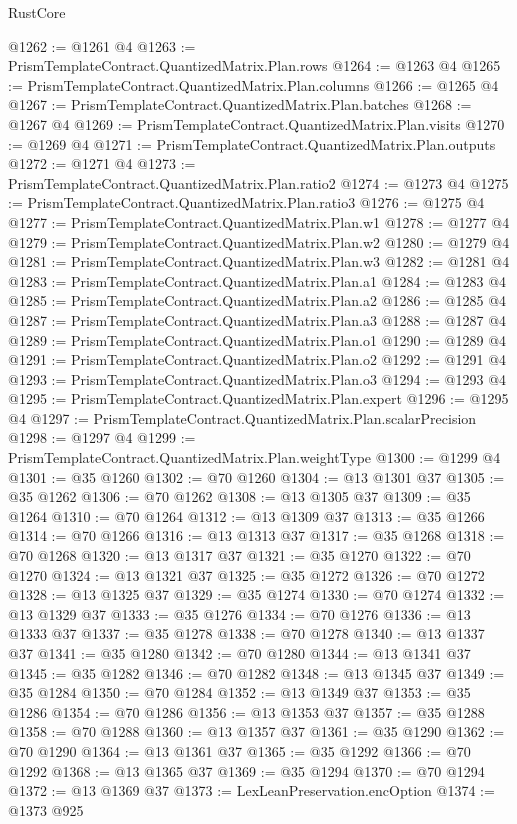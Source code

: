 \begin{lexlean}{RustCore}
\begin{coremodule}
@1262 := @1261 @4
@1263 := PrismTemplateContract.QuantizedMatrix.Plan.rows
@1264 := @1263 @4
@1265 := PrismTemplateContract.QuantizedMatrix.Plan.columns
@1266 := @1265 @4
@1267 := PrismTemplateContract.QuantizedMatrix.Plan.batches
@1268 := @1267 @4
@1269 := PrismTemplateContract.QuantizedMatrix.Plan.visits
@1270 := @1269 @4
@1271 := PrismTemplateContract.QuantizedMatrix.Plan.outputs
@1272 := @1271 @4
@1273 := PrismTemplateContract.QuantizedMatrix.Plan.ratio2
@1274 := @1273 @4
@1275 := PrismTemplateContract.QuantizedMatrix.Plan.ratio3
@1276 := @1275 @4
@1277 := PrismTemplateContract.QuantizedMatrix.Plan.w1
@1278 := @1277 @4
@1279 := PrismTemplateContract.QuantizedMatrix.Plan.w2
@1280 := @1279 @4
@1281 := PrismTemplateContract.QuantizedMatrix.Plan.w3
@1282 := @1281 @4
@1283 := PrismTemplateContract.QuantizedMatrix.Plan.a1
@1284 := @1283 @4
@1285 := PrismTemplateContract.QuantizedMatrix.Plan.a2
@1286 := @1285 @4
@1287 := PrismTemplateContract.QuantizedMatrix.Plan.a3
@1288 := @1287 @4
@1289 := PrismTemplateContract.QuantizedMatrix.Plan.o1
@1290 := @1289 @4
@1291 := PrismTemplateContract.QuantizedMatrix.Plan.o2
@1292 := @1291 @4
@1293 := PrismTemplateContract.QuantizedMatrix.Plan.o3
@1294 := @1293 @4
@1295 := PrismTemplateContract.QuantizedMatrix.Plan.expert
@1296 := @1295 @4
@1297 := PrismTemplateContract.QuantizedMatrix.Plan.scalarPrecision
@1298 := @1297 @4
@1299 := PrismTemplateContract.QuantizedMatrix.Plan.weightType
@1300 := @1299 @4
@1301 := @35 @1260
@1302 := @70 @1260
@1304 := @13 @1301 @37
@1305 := @35 @1262
@1306 := @70 @1262
@1308 := @13 @1305 @37
@1309 := @35 @1264
@1310 := @70 @1264
@1312 := @13 @1309 @37
@1313 := @35 @1266
@1314 := @70 @1266
@1316 := @13 @1313 @37
@1317 := @35 @1268
@1318 := @70 @1268
@1320 := @13 @1317 @37
@1321 := @35 @1270
@1322 := @70 @1270
@1324 := @13 @1321 @37
@1325 := @35 @1272
@1326 := @70 @1272
@1328 := @13 @1325 @37
@1329 := @35 @1274
@1330 := @70 @1274
@1332 := @13 @1329 @37
@1333 := @35 @1276
@1334 := @70 @1276
@1336 := @13 @1333 @37
@1337 := @35 @1278
@1338 := @70 @1278
@1340 := @13 @1337 @37
@1341 := @35 @1280
@1342 := @70 @1280
@1344 := @13 @1341 @37
@1345 := @35 @1282
@1346 := @70 @1282
@1348 := @13 @1345 @37
@1349 := @35 @1284
@1350 := @70 @1284
@1352 := @13 @1349 @37
@1353 := @35 @1286
@1354 := @70 @1286
@1356 := @13 @1353 @37
@1357 := @35 @1288
@1358 := @70 @1288
@1360 := @13 @1357 @37
@1361 := @35 @1290
@1362 := @70 @1290
@1364 := @13 @1361 @37
@1365 := @35 @1292
@1366 := @70 @1292
@1368 := @13 @1365 @37
@1369 := @35 @1294
@1370 := @70 @1294
@1372 := @13 @1369 @37
@1373 := LexLeanPreservation.encOption
@1374 := @1373 @925

\end{coremodule}
\end{lexlean}
